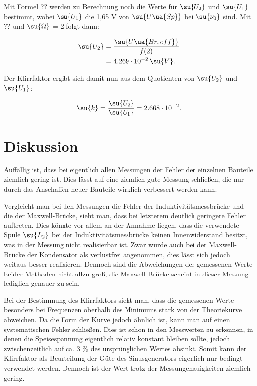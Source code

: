 Mit Formel ?? werden zu Berechnung noch die Werte für $\su{U_2}$ und $\su{U_1}$ bestimmt,
wobei $\su{U_1}$ die 1,65 V von $\su{U\ua{Sp}}$ bei $\su{\nu_0}$ sind. Mit ?? und
 $\su{\Omega}$ = 2 folgt dann:

\begin{align}
  \su{U_2} &= \frac{\su{U\ua{Br,eff}}}{f(2)} \\
           &= 4.269 \cdot 10^{-2} \, \su{V}.
\end{align}

Der Klirrfaktor ergibt sich damit nun aus dem Quotienten von $\su{U_2}$ und
$\su{U_1}$:

\begin{equation}
  \su{k} = \frac{\su{U_2}}{\su{U_1}} = 2.668 \cdot 10^{-2}.
\end{equation}

\newpage


\section{Diskussion}

Auffällig ist, dass bei eigentlich allen Messungen der Fehler der einzelnen
Bauteile ziemlich gering ist. Dies lässt auf eine ziemlich gute Messung schließen,
die nur durch das Anschaffen neuer Bauteile wirklich verbessert werden kann.

Vergleicht man bei den Messungen die Fehler der Induktivitätsmessbrücke und die
der Maxwell-Brücke, sieht man, dass bei letzterem deutlich geringere Fehler
auftreten. Dies könnte vor allem an der Annahme liegen, dass die verwendete
Spule $\su{L_2}$ bei der Induktivitätsmessbrücke keinen Innenwiderstand besitzt,
was in der Messung nicht realisierbar ist.
Zwar wurde auch bei der Maxwell-Brücke der Kondensator als verlustfrei angenommen,
dies lässt sich jedoch weitaus besser realisieren. Dennoch sind die Abweichungen
der gemessenen Werte beider Methoden nicht allzu groß, die Maxwell-Brücke
scheint in dieser Messung lediglich genauer zu sein.

Bei der Bestimmung des Klirrfaktors sieht man, dass die gemessenen Werte besonders
bei Frequenzen oberhalb des Minimums stark von der Theoriekurve abweichen. Da die
Form der Kurve jedoch ähnlich ist, kann man auf einen systematischen Fehler schließen.
Dies ist schon in den Messwerten zu erkennen, in denen die Speisespannung eigentlich
relativ konstant bleiben sollte, jedoch zwischenzeitlich auf ca. 3 $\%$ des
ursprünglichen Wertes absinkt. Somit kann der Klirrfaktor als Beurteilung der
Güte des Sinusgenerators eigenlich nur bedingt verwendet werden. Dennoch ist
der Wert trotz der Messungenauigkeiten ziemlich gering.
